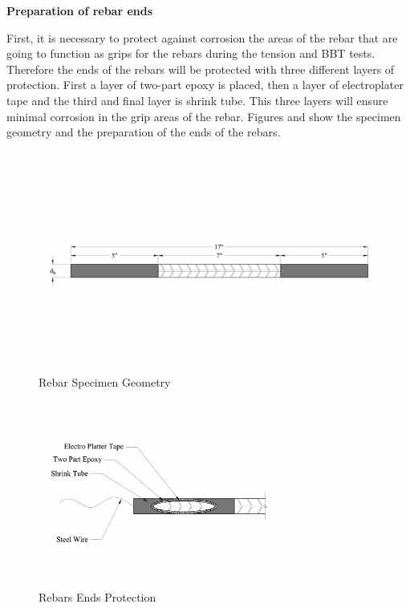 \textbf{Preparation of rebar ends}

First, it is necessary to protect against corrosion the areas of the rebar that are going to function as grips for the rebars during the tension and BBT tests. Therefore the ends of the rebars will be protected with three different layers of protection. First a layer of two-part epoxy is placed, then a layer of electroplater tape and the third and final layer is shrink tube. This three layers will ensure minimal corrosion in the grip areas of the rebar. Figures  and  show the specimen geometry and the preparation of the ends of the rebars.
\begin{figure}[htbp]
	\centering
	\includegraphics[width=1.0\textwidth]{Chapter-3/figs/RebarSamples}
	\caption{Rebar Specimen Geometry}
	\label{fig:RebarSpecimenGeomtry}
\end{figure}

\begin{figure}[htbp]
	\centering
	\includegraphics[width=0.7\textwidth]{Chapter-3/figs/Rebar_Ends}
	\caption{Rebars Ends Protection}
	\label{fig:RebarEndsProtection}
\end{figure}

